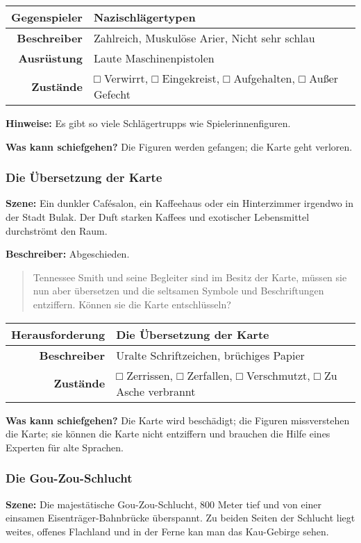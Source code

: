 \documentclass[]{article}
\begin{document}
\begin{longtable}[]{@{}rl@{}}
\toprule
Gegenspieler & Nazischlägertypen\tabularnewline
\midrule
\endhead
\textbf{Beschreiber} & Zahlreich, Muskulöse Arier, Nicht sehr
schlau\tabularnewline
\textbf{Ausrüstung} & Laute Maschinenpistolen\tabularnewline
\textbf{Zustände} & □ Verwirrt, □ Eingekreist, □ Aufgehalten, □ Außer
Gefecht\tabularnewline
\bottomrule
\end{longtable}

\textbf{Hinweise:} Es gibt so viele Schlägertrupps wie
Spielerinnenfiguren.

 \textbf{Was kann schiefgehen?} Die Figuren werden gefangen; die Karte
geht verloren.

\subsubsection{Die Übersetzung der
Karte}\label{die-uxfcbersetzung-der-karte}

\textbf{Szene:} Ein dunkler Cafésalon, ein Kaffeehaus oder ein
Hinterzimmer irgendwo in der Stadt Bulak. Der Duft starken Kaffees und
exotischer Lebensmittel durchströmt den Raum.

\textbf{Beschreiber:} Abgeschieden.

\begin{quote}
Tennessee Smith und seine Begleiter sind im Besitz der Karte, müssen sie
nun aber übersetzen und die seltsamen Symbole und Beschriftungen
entziffern. Können sie die Karte entschlüsseln?
\end{quote}

\begin{longtable}[]{@{}rl@{}}
\toprule
Herausforderung & Die Übersetzung der Karte\tabularnewline
\midrule
\endhead
\textbf{Beschreiber} & Uralte Schriftzeichen, brüchiges
Papier\tabularnewline
\textbf{Zustände} & □ Zerrissen, □ Zerfallen, □ Verschmutzt, □ Zu Asche
verbrannt\tabularnewline
\bottomrule
\end{longtable}

\textbf{Was kann schiefgehen?} Die Karte wird beschädigt; die Figuren
missverstehen die Karte; sie können die Karte nicht entziffern und
brauchen die Hilfe eines Experten für alte Sprachen.

\subsubsection{Die Gou-Zou-Schlucht}\label{die-gou-zou-schlucht}

\textbf{Szene:} Die majestätische Gou-Zou-Schlucht, 800 Meter tief und
von einer einsamen Eisenträger-Bahnbrücke überspannt. Zu beiden Seiten
der Schlucht liegt weites, offenes Flachland und in der Ferne kan man
das Kau-Gebirge sehen.
\end{document}
